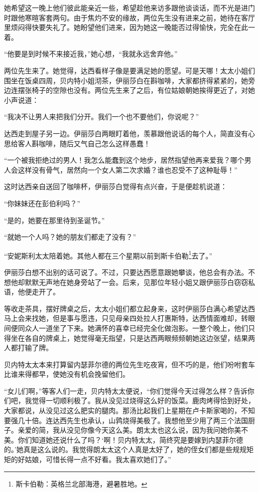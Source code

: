 \par 她希望这一晚上他们彼此能亲近一些，希望趁他来访多跟他谈谈话，而不光是进门时跟他寒暄客套两句。由于焦灼不安的缘故，两位先生没有进来之前，她待在客厅里烦闷得快要失礼了。她盼望他们进来，因为她这一晚能否过得愉快，完全在此一着。
\par “他要是到时候不来接近我，”她心想，“我就永远舍弃他。”
\par 两位先生来了。她觉得，达西看样子像是要满足她的愿望。可是天哪！太太小姐们围坐在饭桌四周，贝内特小姐沏茶，伊丽莎白在斟咖啡，大家都挤得紧紧的，她旁边连摆张椅子的空隙也没有。两位先生来了之后，有位姑娘朝她挨得更近了，对她小声说道：
\par “我决不让男人来把我们分开。我们一个也不要他们，你说呢？”
\par 达西走到屋子另一边。伊丽莎白两眼盯着他，羡慕跟他说话的每个人，简直没有心思给客人斟咖啡，随后又气自己怎么这样愚蠢！
\par “一个被我拒绝过的男人！我怎么能蠢到这个地步，居然指望他再来爱我？哪个男人会这样没有骨气，居然向一个女人第二次求婚？谁也忍受不了这种耻辱！”
\par 这时达西亲自送回了咖啡杯，伊丽莎白觉得有点兴奋，于是便趁机说道：
\par “你妹妹还在彭伯利吗？”
\par “是的，她要在那里待到圣诞节。”
\par “就她一个人吗？她的朋友们都走了没有？”
\par “安妮斯利太太陪着她。其他人都在三个星期以前到斯卡伯勒\footnote{斯卡伯勒：英格兰北部海港，避暑胜地。}去了。”
\par 伊丽莎白想不出别的话可说了。不过，只要达西愿意跟她攀谈，他总会有办法。不想他却默默无声地在她身旁站了一会。后来，见那位年轻小姐又跟伊丽莎白窃窃私语，他便走开了。
\par 等收走茶具，摆好牌桌之后，太太小姐们都立起身来，这时伊丽莎白满心希望达西马上会来找她，但是事与愿违，只见母亲四处拉人打惠斯特，达西情面难却，转眼间便同众人一道坐了下来。她满怀的喜幸已经完全化做泡影。一整个晚上，他们只得坐在各自的牌桌上，她觉得毫无指望，只是达西两眼频频朝她这边张望，结果两人都打输了牌。
\par 贝内特太太本来打算留内瑟菲尔德的两位先生吃夜宵，但不巧的是，他们吩咐套车比谁来得都早，使她没有机会挽留他们。
\par “女儿们啊，”等客人们一走，贝内特太太便说，“你们觉得今天过得怎么样？告诉你们吧，我觉得一切顺利极了。我从没见过烧得这么好的饭菜。鹿肉烤得恰到好处，大家都说，从没见过这么肥实的腿肉。那汤比起我们上星期在卢卡斯家喝的，不知要强几十倍。连达西先生也承认，山鹑烧得美极了。我想他至少用了两三个法国厨子。亲爱的简，我从没见你像今天这么美。朗太太也这么说，因为我问她你美不美。你们知道她还说什么了吗？‘啊！贝内特太太，简终究是要嫁到内瑟菲尔德的。’她真是这么说的。我觉得朗太太这个人真是太好了，她的侄女们都是些规规矩矩的好姑娘，可惜长得一点不好看。我太喜欢她们了。”
